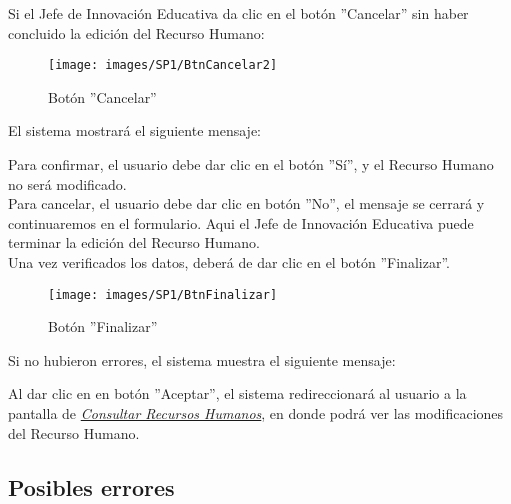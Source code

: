         Si el Jefe de Innovación Educativa da clic en el botón ''Cancelar'' sin haber concluido la edición del Recurso Humano:
        
        \begin{figure}[!hbtp]
        	\centering
        	\hypertarget{cancel2}{\texttt{[image: images/SP1/BtnCancelar2]}}
        	\caption{Botón ''Cancelar''}
        	\label{cancel2}
        \end{figure}
        
        El sistema mostrará el siguiente mensaje:
        
        Para confirmar, el usuario debe dar clic en el botón ''Sí'', y el Recurso Humano no será modificado.\\
        
        Para cancelar, el usuario debe dar clic en botón ''No'', el mensaje se cerrará y continuaremos en el formulario. Aqui el Jefe de Innovación Educativa puede terminar la edición del Recurso Humano.\\

        Una vez verificados los datos, deberá de dar clic en el botón ''Finalizar''.
        \begin{figure}[!hbtp]
        	\centering
        	\hypertarget{btnfin}{\texttt{[image: images/SP1/BtnFinalizar]}}
        	\caption{Botón ''Finalizar''}
        	\label{btnfin}
        \end{figure}
        
        Si no hubieron errores, el sistema muestra el siguiente mensaje:
        
        Al dar clic en en botón ''Aceptar'', el sistema redireccionará al usuario a la pantalla de \hyperlink{consultarrh}{\textit{Consultar Recursos Humanos}}, en donde podrá ver las modificaciones del Recurso Humano.\\
        
        \subsection{Posibles errores}
    
